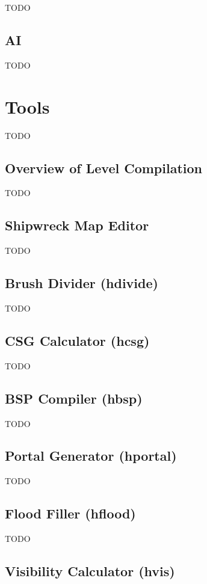 TODO

\subsection{AI}

TODO

\section{Tools}

TODO

\subsection{Overview of Level Compilation}

TODO

\subsection{Shipwreck Map Editor}

TODO

\subsection{Brush Divider (hdivide)}

TODO

\subsection{CSG Calculator (hcsg)}

TODO

\subsection{BSP Compiler (hbsp)}

TODO

\subsection{Portal Generator (hportal)}

TODO

\subsection{Flood Filler (hflood)}

TODO

\subsection{Visibility Calculator (hvis)}

